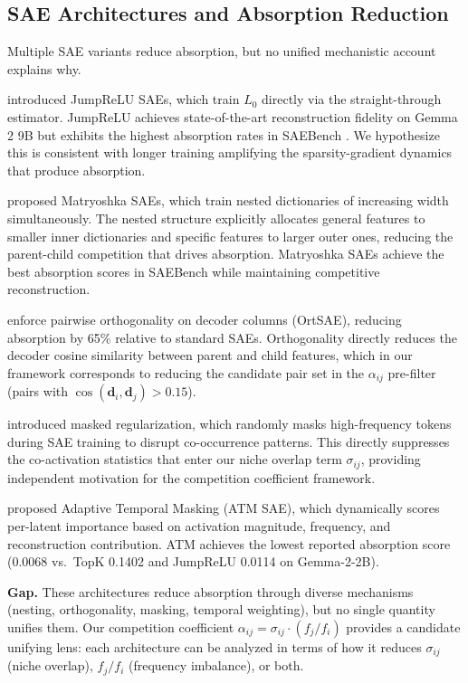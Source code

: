 \documentclass{article}
\begin{document}
\subsection{SAE Architectures and Absorption Reduction}

Multiple SAE variants reduce absorption, but no unified mechanistic account explains why.

\citet{rajamanoharan2024jumprelu} introduced JumpReLU SAEs, which train $L_0$ directly via the straight-through estimator. JumpReLU achieves state-of-the-art reconstruction fidelity on Gemma 2 9B but exhibits the highest absorption rates in SAEBench \citep{karvonen2025saebench}. We hypothesize this is consistent with longer training amplifying the sparsity-gradient dynamics that produce absorption.

\citet{bussmann2025matryoshka} proposed Matryoshka SAEs, which train nested dictionaries of increasing width simultaneously. The nested structure explicitly allocates general features to smaller inner dictionaries and specific features to larger outer ones, reducing the parent-child competition that drives absorption. Matryoshka SAEs achieve the best absorption scores in SAEBench while maintaining competitive reconstruction.

\citet{bussmann2025ortsae} enforce pairwise orthogonality on decoder columns (OrtSAE), reducing absorption by 65\% relative to standard SAEs. Orthogonality directly reduces the decoder cosine similarity between parent and child features, which in our framework corresponds to reducing the candidate pair set in the $\alpha_{ij}$ pre-filter (pairs with $\cos(\mathbf{d}_i, \mathbf{d}_j) > 0.15$).

\citet{narayanaswamy2025masked} introduced masked regularization, which randomly masks high-frequency tokens during SAE training to disrupt co-occurrence patterns. This directly suppresses the co-activation statistics that enter our niche overlap term $\sigma_{ij}$, providing independent motivation for the competition coefficient framework.

\citet{li2025atm} proposed Adaptive Temporal Masking (ATM SAE), which dynamically scores per-latent importance based on activation magnitude, frequency, and reconstruction contribution. ATM achieves the lowest reported absorption score (0.0068 vs.\ TopK 0.1402 and JumpReLU 0.0114 on Gemma-2-2B).

\textbf{Gap.} These architectures reduce absorption through diverse mechanisms (nesting, orthogonality, masking, temporal weighting), but no single quantity unifies them. Our competition coefficient $\alpha_{ij} = \sigma_{ij} \cdot (f_j / f_i)$ provides a candidate unifying lens: each architecture can be analyzed in terms of how it reduces $\sigma_{ij}$ (niche overlap), $f_j / f_i$ (frequency imbalance), or both.
\end{document}
